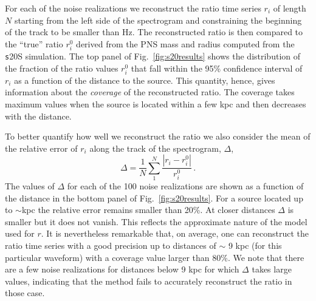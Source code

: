 For each of the noise realizations we reconstruct the ratio time series {$r_i$} of length $N$ starting from the left side of the spectrogram and constraining the beginning of the track to be smaller than \unit[200]{Hz}. 
The reconstructed ratio is then compared to the ``true'' ratio {$r_i^0$} derived from the PNS mass and radius computed from the {\texttt s20S} simulation. The top panel of Fig.~\ref{fig:s20results} shows the distribution of the fraction of the ratio values {$r_i^0$} that fall within the 95\% confidence interval of {$r_i$} as a function of the distance to the source. This quantity, hence, gives information about the {\it coverage} of the reconstructed ratio. The coverage takes maximum values when the source is located within a few kpc and then decreases with the distance.

To better quantify how well we reconstruct the ratio we also consider  the mean of the relative error of $r_i$ along 
the track of the spectrogram, $\Delta$,  
\begin{equation}
\Delta=\frac{1}{N}\sum_1^N\frac{|r_i-r_i^0|}{r_i^0}\,.
\end{equation}
The values of $\Delta$ for each of the 100 noise realizations are shown as a function of the distance
in the bottom panel of Fig.~\ref{fig:s20results}. For a source located up to $\sim$\unit[9]{kpc} the relative error
remains smaller than 20\%. At closer distances $\Delta$ is smaller but it does not vanish. This reflects the approximate nature of the model used for $r$. It is nevertheless remarkable that, on average, one can reconstruct the ratio time series with a good
precision up to distances of $\sim$ 9 kpc (for this particular waveform) with a coverage value
larger than 80\%. We note that there are a few noise realizations for distances below 9 kpc for which
$\Delta$ takes large values, indicating that the method fails to accurately reconstruct the ratio in those case. 

